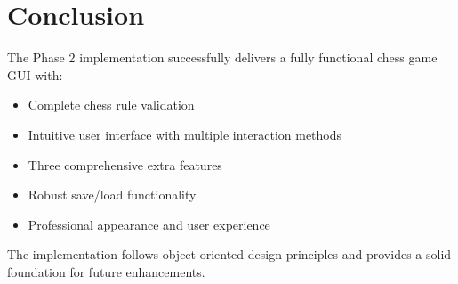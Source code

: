 \documentclass[12pt]{article}
\begin{document}
\section{Conclusion}

The Phase 2 implementation successfully delivers a fully functional chess game GUI with:
\begin{itemize}
    \item Complete chess rule validation
    \item Intuitive user interface with multiple interaction methods
    \item Three comprehensive extra features
    \item Robust save/load functionality
    \item Professional appearance and user experience
\end{itemize}

The implementation follows object-oriented design principles and provides a solid foundation for future enhancements.
\end{document}
